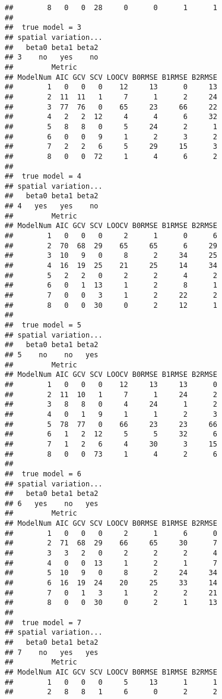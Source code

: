 \documentclass{article}\usepackage[]{graphicx}\usepackage[]{color}
\makeatletter
\newenvironment{kframe}{%
 \def\at@end@of@kframe{}%
 \ifinner\ifhmode%
  \def\at@end@of@kframe{\end{minipage}}%
  \begin{minipage}{\columnwidth}%
 \fi\fi%
 \def\FrameCommand##1{\hskip\@totalleftmargin \hskip-\fboxsep
 \colorbox{shadecolor}{##1}\hskip-\fboxsep
     \hskip-\linewidth \hskip-\@totalleftmargin \hskip\columnwidth}%
 \MakeFramed {\advance\hsize-\width
   \@totalleftmargin\z@ \linewidth\hsize
   \@setminipage}}%
 {\par\unskip\endMakeFramed%
 \at@end@of@kframe}
\newenvironment{knitrout}{}{} %
\makeatother
\begin{document}
\begin{knitrout}
\begin{kframe}
\begin{verbatim}
##        8   0   0  28     0      0      1      1
## 
##  true model = 3 
## spatial variation...
##   beta0 beta1 beta2
## 3    no   yes    no
##         Metric
## ModelNum AIC GCV SCV LOOCV B0RMSE B1RMSE B2RMSE
##        1   0   0   0    12     13      0     13
##        2  11  11   1     7      1      2     24
##        3  77  76   0    65     23     66     22
##        4   2   2  12     4      4      6     32
##        5   8   8   0     5     24      2      1
##        6   0   0   9     1      2      3      2
##        7   2   2   6     5     29     15      3
##        8   0   0  72     1      4      6      2
## 
##  true model = 4 
## spatial variation...
##   beta0 beta1 beta2
## 4   yes   yes    no
##         Metric
## ModelNum AIC GCV SCV LOOCV B0RMSE B1RMSE B2RMSE
##        1   0   0   0     2      1      0      6
##        2  70  68  29    65     65      6     29
##        3  10   9   0     8      2     34     25
##        4  16  19  25    21     25     14     34
##        5   2   2   0     2      2      4      2
##        6   0   1  13     1      2      8      1
##        7   0   0   3     1      2     22      2
##        8   0   0  30     0      2     12      1
## 
##  true model = 5 
## spatial variation...
##   beta0 beta1 beta2
## 5    no    no   yes
##         Metric
## ModelNum AIC GCV SCV LOOCV B0RMSE B1RMSE B2RMSE
##        1   0   0   0    12     13     13      0
##        2  11  10   1     7      1     24      2
##        3   8   8   0     4     24      1      2
##        4   0   1   9     1      1      2      3
##        5  78  77   0    66     23     23     66
##        6   1   2  12     5      5     32      6
##        7   1   2   6     4     30      3     15
##        8   0   0  73     1      4      2      6
## 
##  true model = 6 
## spatial variation...
##   beta0 beta1 beta2
## 6   yes    no   yes
##         Metric
## ModelNum AIC GCV SCV LOOCV B0RMSE B1RMSE B2RMSE
##        1   0   0   0     2      1      6      0
##        2  71  68  29    66     65     30      7
##        3   3   2   0     2      2      2      4
##        4   0   0  13     1      2      1      7
##        5  10   9   0     8      2     24     34
##        6  16  19  24    20     25     33     14
##        7   0   1   3     1      2      2     21
##        8   0   0  30     0      2      1     13
## 
##  true model = 7 
## spatial variation...
##   beta0 beta1 beta2
## 7    no   yes   yes
##         Metric
## ModelNum AIC GCV SCV LOOCV B0RMSE B1RMSE B2RMSE
##        1   0   0   0     5     13      1      1
##        2   8   8   1     6      0      2      2

\end{verbatim}
\end{kframe}
\end{knitrout}
\end{document}
